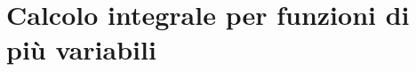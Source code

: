 \documentclass[../appunti-analisi.tex]{subfiles}
\begin{document}
\section{Calcolo integrale per funzioni di più variabili}


\newpage

\newpage

\end{document}
